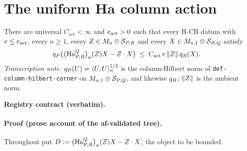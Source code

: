 \section{The uniform Ha column action}\label{sec:hcb1-column-action}

\begin{lemma}\label{lem:hcb1-column-action}
There are universal $C_{\mathrm{act}}<\infty$ and $e_{\mathrm{act}}>0$ such that every
H-CB datum with $e\le e_{\mathrm{act}}$, every $n\ge1$, every
$Z\in M_{n}\otimes \mathcal S_{P,R}$ and every $X\in M_{n,1}\otimes\mathcal S_{R,Q}$ satisfy
\begin{equation}\label{eq:ca-main}
  q_{P}\bigl(\bigl(\mathrm{Ha}^{Q}_{P,R}\bigr)_{n}(Z)X-Z\mathbin{\cdot} X\bigr)
  \;\le\;C_{\mathrm{act}}\,e\,\lVert Z\rVert\,q_{R}(X).
\end{equation}
\emph{Transcription note.} $q_{P}(U)=\langle U,U\rangle_{n}^{1/2}$ is the column-Hilbert norm of
\texttt{def-column-hilbert-corner} on $M_{n,1}\otimes\mathcal S_{P,Q}$, and likewise
$q_{R}$; $\lVert Z\rVert$ is the ambient norm.
\end{lemma}

\noindent\textbf{Registry contract (verbatim).}

\paragraph{Proof (prose account of the af-validated tree).}
Throughout put $D:=\bigl(\mathrm{Ha}^{Q}_{P,R}\bigr)_{n}(Z)X-Z\mathbin{\cdot} X$, the object to be bounded.

